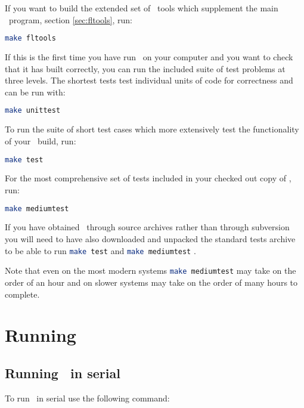 If you want to build the extended set of \fluidity\ tools which supplement the
main \fluidity\ program, section \ref{sec:fltools}, run:

\begin{lstlisting}[language=Bash]
make fltools
\end{lstlisting}

If this is the first time you have run \fluidity\ on your computer and you want
to check that it has built correctly, you can run the included suite of test
problems at three levels. The shortest tests test individual units of code for
correctness and can be run with:

\begin{lstlisting}[language=Bash]
make unittest
\end{lstlisting}

To run the suite of short test cases which more extensively test the
functionality of your \fluidity\ build, run:

\begin{lstlisting}[language=Bash]
make test
\end{lstlisting}

For the most comprehensive set of tests included in your checked out copy of
\fluidity, run:

\begin{lstlisting}[language=Bash]
make mediumtest
\end{lstlisting}

If you have obtained \fluidity\ through source archives rather than through
subversion you will need to have also downloaded and unpacked the standard
tests archive to be able to run \lstinline[language=Bash]+make test+ and
\lstinline[language=Bash]+make mediumtest+ .

Note that even on the most modern systems
\lstinline[language=Bash]+make mediumtest+ may take on the order of an hour and
on slower systems may take on the order of many hours to complete.


\section{Running \fluidity}
\label{sec:running_fluidity}


\subsection{Running \fluidity\ in serial}
\label{sec:running_fluidity_in_serial}

To run \fluidity\ in serial use the following command:

